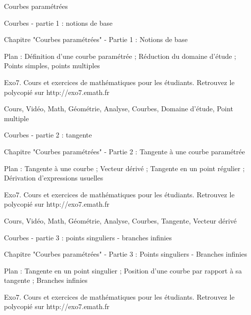 
   Courbes paramétrées




Courbes - partie 1 : notions de base



Chapitre "Courbes paramétrées" - Partie 1 : Notions de base

Plan : Définition d'une courbe paramétrée ; Réduction du domaine d'étude ; 
Points simples, points multiples

Exo7. Cours et exercices de mathématiques pour les étudiants.
Retrouvez le polycopié sur http://exo7.emath.fr


Cours, Vidéo, Math, Géométrie, Analyse, Courbes, Domaine d'étude, Point multiple




Courbes - partie 2 : tangente



Chapitre "Courbes paramétrées" - Partie 2 : Tangente à une courbe paramétrée

Plan : Tangente à une courbe ; Vecteur dérivé ; 
Tangente en un point régulier ; Dérivation d'expressions usuelles

Exo7. Cours et exercices de mathématiques pour les étudiants.
Retrouvez le polycopié sur http://exo7.emath.fr


Cours, Vidéo, Math, Géométrie, Analyse, Courbes, Tangente, Vecteur dérivé




Courbes - partie 3 : points singuliers - branches infinies



Chapitre "Courbes paramétrées" - Partie 3 : Points singuliers - Branches infinies

Plan : Tangente en un point singulier ; Position d'une courbe par rapport à sa tangente ;
Branches infinies

Exo7. Cours et exercices de mathématiques pour les étudiants.
Retrouvez le polycopié sur http://exo7.emath.fr

